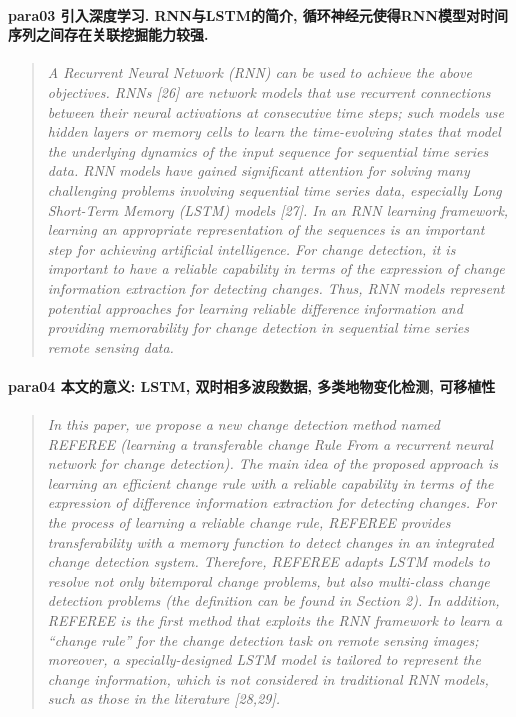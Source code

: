 \paragraph*{para03
    \textcolor[RGB]{17, 205, 29}{引入深度学习. RNN与LSTM的简介, 循环神经元使得RNN模型对时间序列之间存在关联挖掘能力较强.}}
\begin{quotation}
    \itshape
    A Recurrent Neural Network (RNN) can be used to achieve the above objectives. RNNs [26] are network models that use recurrent connections between their neural activations at consecutive time steps; such models use hidden layers or memory cells to learn the
    time-evolving states that model the underlying dynamics of the input sequence for sequential time
    series data. RNN models have gained significant attention for solving many challenging problems
    involving sequential time series data, especially Long Short-Term Memory (LSTM) models [27]. In an
    RNN learning framework, learning an appropriate representation of the sequences is an important step
    for achieving artificial intelligence. For change detection, it is important to have a reliable capability in terms of the expression of change information extraction for detecting changes. Thus, RNN models represent potential approaches for learning reliable difference information and providing memorability for change detection in sequential time series remote sensing data.
\end{quotation}

\paragraph*{para04
    \textcolor[RGB]{17, 205, 29}{本文的意义: LSTM, 双时相多波段数据, 多类地物变化检测, 可移植性}}
\begin{quotation}
    \itshape
    In this paper, we propose a new change detection method named REFEREE (learning a transferable change Rule From a recurrent neural network for change detection). The main idea of the proposed approach is learning an efficient change rule with a reliable capability in terms of the expression of difference information extraction for detecting changes. For the process of learning a reliable change rule, REFEREE provides transferability with a memory function to detect changes in an integrated change detection system. Therefore, REFEREE adapts LSTM models to resolve not only bitemporal change problems, but also multi-class change detection problems (the definition can be found in Section 2). In addition, REFEREE is the first method that exploits the RNN framework to learn a “change rule” for the change detection task on remote sensing images; moreover, a specially-designed LSTM model is tailored to represent the change information, which is not considered in traditional RNN models, such as those in the literature [28,29].
\end{quotation}

